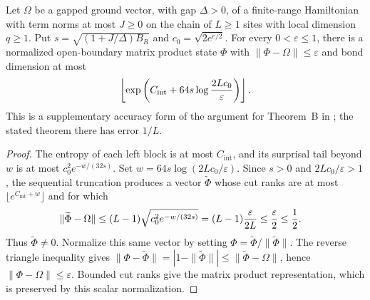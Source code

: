 \begin{corollary}
    \label{thm:chain_mps_approximation_error}
    \leanok
    Let $\Omega$ be a gapped ground vector, with gap $\Delta>0$, of a
    finite-range Hamiltonian with term norms at most $J\ge0$ on the chain of
    $L\ge1$ sites with local dimension $q\ge1$. Put
    $s=\sqrt{(1+J/\Delta)B_R}$ and $c_0=\sqrt{2e^{e/2}}$.
    For every $0<\varepsilon\le1$, there is a normalized open-boundary
    matrix product state $\Phi$ with $\|\Phi-\Omega\|\le\varepsilon$ and
    bond dimension at most
    \begin{align}
        \left\lfloor\exp\left(C_{\mathrm{int}}
        +64s\log\frac{2Lc_0}{\varepsilon}\right)\right\rfloor. \notag
    \end{align}
    This is a supplementary accuracy form of the argument for Theorem~B
    in \cite[Part~IIa]{TNLean2026OneDimensional}; the stated theorem there
    has error $1/L$.
\end{corollary}
\begin{proof}
    \leanok
    The entropy of each left block is at most $C_{\mathrm{int}}$, and its
    surprisal tail beyond $w$ is at most $c_0^2e^{-w/(32s)}$.
    Set $w=64s\log(2Lc_0/\varepsilon)$. Since $s>0$ and
    $2Lc_0/\varepsilon>1$, the sequential truncation produces a vector
    $\widetilde\Phi$ whose cut ranks are at most
    $\lfloor e^{C_{\mathrm{int}}+w}\rfloor$ and for which
    \begin{align}
        \|\widetilde\Phi-\Omega\|
         & \le (L-1)\sqrt{c_0^2e^{-w/(32s)}}
        =(L-1)\frac{\varepsilon}{2L}
        \le\frac{\varepsilon}{2}\le\frac12. \notag
    \end{align}
    Thus $\widetilde\Phi\ne0$. Normalize this same vector by setting
    $\Phi=\widetilde\Phi/\|\widetilde\Phi\|$.
    The reverse triangle inequality gives
    $\|\Phi-\widetilde\Phi\|=|1-\|\widetilde\Phi\||
        \le\|\widetilde\Phi-\Omega\|$, hence
    $\|\Phi-\Omega\|\le\varepsilon$.
    Bounded cut ranks give the matrix product representation, which is
    preserved by this scalar normalization.
\end{proof}

